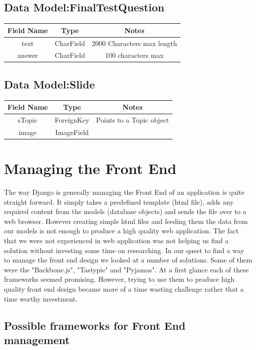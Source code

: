 \documentclass{l3proj}
\begin{document}
{\subsection{Data Model:FinalTestQuestion}
\begin{tabular}{|c|c|c|}
\hline \textbf{Field Name} & \textbf{Type} & \textbf{Notes}\\
\hline text & CharField & 2000 Characters max length \\ 
\hline answer & CharField & 100 characters max \\ \hline
\end{tabular}

\subsection{Data Model:Slide}
\begin{tabular}{|c|c|c|}
\hline \textbf{Field Name} & \textbf{Type} & \textbf{Notes}\\
\hline sTopic & ForeignKey & Points to a Topic object \\ 
\hline image & ImageField &  \\ \hline
\end{tabular}

\section{Managing the Front End}
The way Django is generally managing the Front End of an application is quite 
straight forward. It simply takes a predefined template (html file), adds any required 
content from the models (database objects) and sends the file over to a web browser. 
However creating simple html files and feeding them the data from our models is not 
enough to produce a high quality web application. The fact that we were not 
experienced in web application was not helping us find a solution without investing 
some time on researching. In our quest to find a way to manage the front end design 
we looked at a number of solutions. Some of them were the "Backbone.js", "Tastypie" 
and "Pyjamas". At a first glance each of these frameworks seemed promising. 
However, trying to use them to produce high quality front end design became more of 
a time wasting challenge rather that a time worthy investment.
\subsection{Possible frameworks for Front End management}
}
\end{document}
